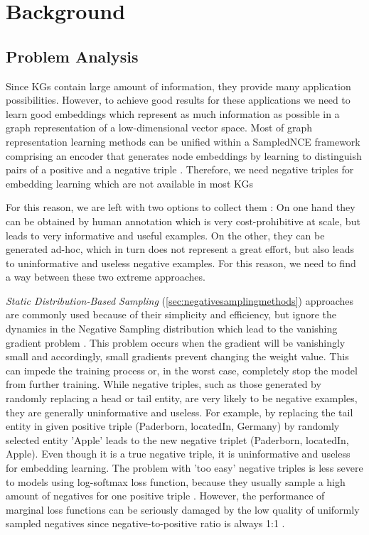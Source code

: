 \chapter{Background}
\label{ch:background}

\section{Problem Analysis} \label{sec:problemanalysis}
Since \acp{KG} contain large amount of information, they provide many application possibilities.
However, to achieve good results for these applications we need to learn good embeddings which represent as much information as possible in a graph representation of a low-dimensional vector space.
Most of graph representation learning methods can be unified within a \ac{SampledNCE} framework comprising an encoder that generates node embeddings by learning to distinguish pairs of a positive and a negative triple \cite{MCNS}.
Therefore, we need negative triples for embedding learning which are not available in most \acp{KG} 

For this reason, we are left with two options to collect them \cite{safavi2021negater}: 
On one hand they can be obtained by human annotation which is very cost-prohibitive at scale, but leads to very informative and useful examples. 
On the other, they can be generated ad-hoc, which in turn does not represent a great effort, but also leads to uninformative and useless negative examples.
For this reason, we need to find a way between these two extreme approaches.

\textit{Static Distribution-Based Sampling} (\autoref{sec:negativesamplingmethods}) approaches are commonly used because of their simplicity and efficiency, but ignore the dynamics in the Negative Sampling distribution which lead to the vanishing gradient problem \cite{qianunderstanding}.
This problem occurs when the gradient will be vanishingly small and accordingly, small gradients prevent changing the weight value.
This can impede the training process or, in the worst case, completely stop the model from further training.
While negative triples, such as those generated by randomly replacing a head or tail entity, are very likely to be negative examples, they are generally uninformative and useless.
For example, by replacing the tail entity in given positive triple (Paderborn, locatedIn, Germany) by randomly selected entity 'Apple' leads to the new negative triplet (Paderborn, locatedIn, Apple).
Even though it is a true negative triple, it is uninformative and useless for embedding learning.
The problem with 'too easy' negative triples is less severe to models using log-softmax loss function, because they usually sample a high amount of negatives for one positive triple \cite{cai2017kbgan}.
However, the performance of marginal loss functions can be seriously damaged by the low quality of uniformly sampled negatives since negative-to-positive ratio is always 1:1 \cite{cai2017kbgan}.

